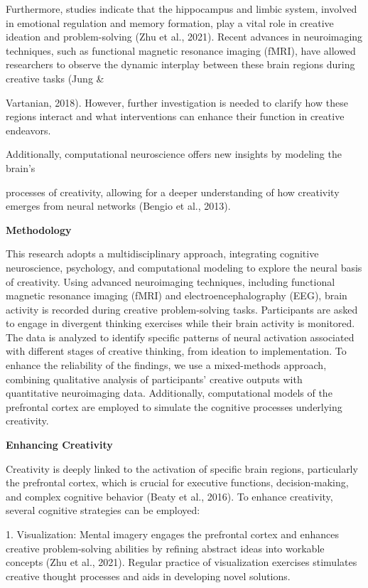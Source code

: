 \documentclass[
]{article}
\begin{document}
Furthermore, studies indicate that the hippocampus and limbic system,
involved in emotional regulation and memory formation, play a vital role
in creative ideation and problem-solving (Zhu et al., 2021). Recent
advances in neuroimaging techniques, such as functional magnetic
resonance imaging (fMRI), have allowed researchers to observe the
dynamic interplay between these brain regions during creative tasks
(Jung \&

Vartanian, 2018). However, further investigation is needed to clarify
how these regions interact and what interventions can enhance their
function in creative endeavors.

Additionally, computational neuroscience offers new insights by modeling
the brain's

processes of creativity, allowing for a deeper understanding of how
creativity emerges from neural networks (Bengio et al., 2013).

\textbf{Methodology}

This research adopts a multidisciplinary approach, integrating cognitive
neuroscience, psychology, and computational modeling to explore the
neural basis of creativity. Using advanced neuroimaging techniques,
including functional magnetic resonance imaging (fMRI) and
electroencephalography (EEG), brain activity is recorded during creative
problem-solving tasks. Participants are asked to engage in divergent
thinking exercises while their brain activity is monitored. The data is
analyzed to identify specific patterns of neural activation associated
with different stages of creative thinking, from ideation to
implementation. To enhance the reliability of the findings, we use a
mixed-methods approach, combining qualitative analysis of participants'
creative outputs with\\
quantitative neuroimaging data. Additionally, computational models of
the prefrontal cortex are employed to simulate the cognitive processes
underlying creativity.

\textbf{Enhancing Creativity}

Creativity is deeply linked to the activation of specific brain regions,
particularly the prefrontal cortex, which is crucial for executive
functions, decision-making, and complex cognitive behavior (Beaty et
al., 2016). To enhance creativity, several cognitive strategies can be
employed:

1. Visualization: Mental imagery engages the prefrontal cortex and
enhances creative problem-solving abilities by refining abstract ideas
into workable concepts (Zhu et al., 2021). Regular practice of
visualization exercises stimulates creative thought processes and aids
in developing novel solutions.
\end{document}
